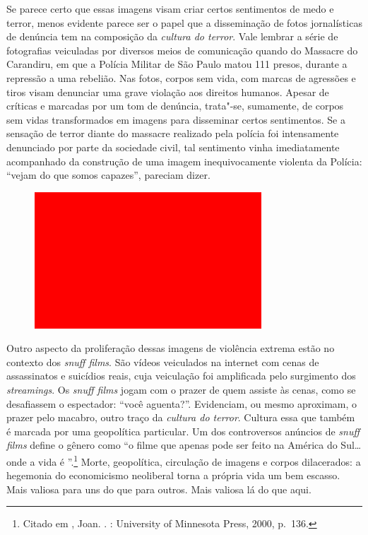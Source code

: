 Se parece certo que essas imagens visam criar certos sentimentos de medo
e terror, menos evidente parece ser o papel que a disseminação de fotos
jornalísticas de denúncia tem na composição da \emph{cultura do terror}.
Vale lembrar a série de fotografias veiculadas por diversos meios de
comunicação quando do Massacre do Carandiru, em que a Polícia Militar de
São Paulo matou 111 presos, durante a repressão a uma rebelião. Nas
fotos, corpos sem vida, com marcas de agressões e tiros visam denunciar
uma grave violação aos direitos humanos. Apesar de críticas e marcadas
por um tom de denúncia, trata"-se, sumamente, de corpos sem vidas
transformados em imagens para disseminar certos sentimentos. Se a
sensação de terror diante do massacre realizado pela polícia foi
intensamente denunciado por parte da sociedade civil, tal sentimento
vinha imediatamente acompanhado da construção de uma imagem
inequivocamente violenta da Polícia: ``vejam do que somos capazes'',
pareciam dizer.

\begin{figure}[!ht]
\centering
 \includegraphics[width=85mm]{./imgs/im1.jpg}
\caption{\footnotesize{}}
\end{figure}


\asterisc

Outro aspecto da proliferação dessas imagens de violência extrema estão no
contexto dos \emph{snuff films}. São vídeos veiculados na internet com
cenas de assassinatos e suicídios reais, cuja veiculação foi amplificada
pelo surgimento dos \emph{streamings}. Os \emph{snuff films} jogam com o
prazer de quem assiste às cenas, como se desafiassem o espectador: ``você
aguenta?''. Evidenciam, ou mesmo aproximam, o prazer pelo macabro, outro
traço da \emph{cultura do terror}. Cultura essa que também é marcada por uma
geopolítica particular. Um dos controversos anúncios de \emph{snuff
films} define o gênero como ``o filme que apenas pode ser feito na
América do Sul\ldots{} onde a vida é ''.\footnote{Citado em , Joan. {}. : University of Minnesota Press, 2000, p.~136.} Morte,
geopolítica, circulação de imagens e corpos dilacerados: a hegemonia do
economicismo neoliberal torna a própria vida um bem escasso. Mais
valiosa para uns do que para outros. Mais valiosa lá do que aqui.

